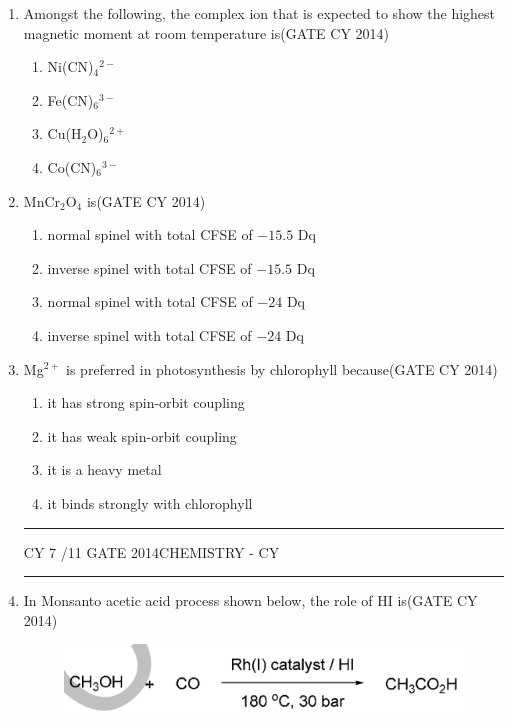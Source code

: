 \documentclass[a4paper,10pt]{exam}
\theoremstyle{remark}
\begin{document}
\begin{enumerate}
\item
Amongst the following, the complex ion that is expected to show the highest magnetic moment at room temperature is\hfill{(GATE CY 2014)}
\begin{multicols}{4}
\begin{enumerate} 
    \item Ni(CN)$_4$$^{2-}$
    \item Fe(CN)$_6$$^{3-}$
    \item Cu(H$_2$O)$_6$$^{2+}$
    \item Co(CN)$_6$$^{3-}$
\end{enumerate}
\end{multicols} 

\item MnCr$_2$O$_4$ is\hfill{(GATE CY 2014)}
\begin{enumerate} 
    \item normal spinel with total CFSE of $-15.5$ Dq
    \item inverse spinel with total CFSE of $-15.5$ Dq
    \item normal spinel with total CFSE of $-24$ Dq
    \item inverse spinel with total CFSE of $-24$ Dq
\end{enumerate}
\item Mg$^{2+}$ is preferred in photosynthesis by chlorophyll because\hfill{(GATE CY 2014)}
\begin{enumerate} 
    \item it has strong spin-orbit coupling
    \item it has weak spin-orbit coupling
    \item it is a heavy metal
    \item it binds strongly with chlorophyll
\end{enumerate}
\vfill
\noindent\rule{\linewidth}{0.4pt}
CY \hfill 7 /11
\newpage
GATE 2014\hfill CHEMISTRY - CY\\
\noindent\rule{\linewidth}{0.4pt}
\item In Monsanto acetic acid process shown below, the role of HI is\hfill{(GATE CY 2014)}
\begin{figure}[H]
    \centering
    \includegraphics[width=0.5\columnwidth]{figs/Q 45.png}
    \caption{}
    \label{fig:placeholder}
\end{figure}


\end{enumerate}
\end{document}
